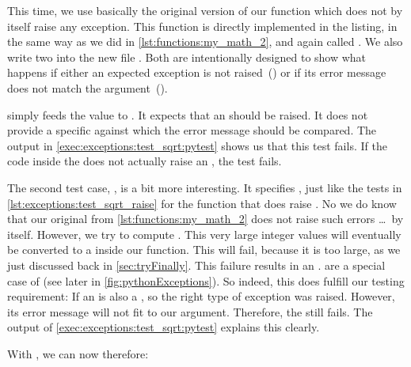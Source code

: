 This time, we use basically the original version of our  function which does not by itself raise any exception.
This function is directly implemented in the listing, in the same way as we did in \cref{lst:functions:my_math_2}, and again called .
We also write two  into the new file .
Both are intentionally designed to show what happens if either an expected exception is not raised~() or if its error message does not match the  argument~().%
%
\begin{sloppypar}%
 simply feeds the value  to .
It expects that an  should be raised.
It does not provide a specific   against which the error message should be compared.
The output in \cref{exec:exceptions:test_sqrt:pytest} shows us that this test fails.
If the code inside the  does not actually raise an , the test fails.%
\end{sloppypar}%
%
\begin{sloppypar}%
The second test case, , is a bit more interesting.
It specifies , just like the tests in \cref{lst:exceptions:test_sqrt_raise} for the  function that does raise .
No we do know that our original  from \cref{lst:functions:my_math_2} does not raise such errors \dots\ by itself.
However, we try to compute .
This very large integer values will eventually be converted to a  inside our function.
This will fail, because it is too large, as we just discussed back in \cref{sec:tryFinally}.
This failure results in an .
 are a special case of  (see later in \cref{fig:pythonExceptions}).
So indeed, this does fulfill our testing requirement:
If an  is also a , so the right type of exception was raised.
However, its error message will not fit to our  argument.
Therefore, the  still fails.
The output of \cref{exec:exceptions:test_sqrt:pytest} explains this clearly.%
\end{sloppypar}%
%
With \pytest, we can now therefore:%
